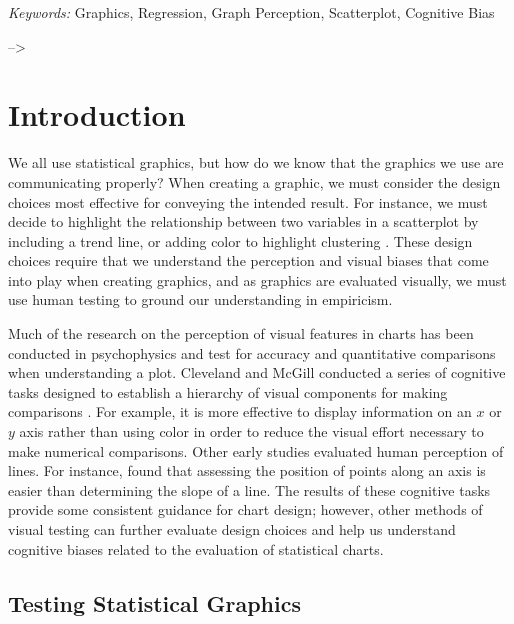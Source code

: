 \documentclass[12pt]{article}
\begin{document}
\noindent%
{\it Keywords:} Graphics, Regression, Graph
Perception, Scatterplot, Cognitive Bias
\vfill

\newpage
{} %

--\textgreater{}

\hypertarget{introduction}{%
\section{Introduction}\label{introduction}}

We all use statistical graphics, but how do we know that the graphics we
use are communicating properly? When creating a graphic, we must
consider the design choices most effective for conveying the intended
result. For instance, we must decide to highlight the relationship
between two variables in a scatterplot by including a trend line, or
adding color to highlight clustering \citep{vanderplas2017clusters}.
These design choices require that we understand the perception and
visual biases that come into play when creating graphics, and as
graphics are evaluated visually, we must use human testing to ground our
understanding in empiricism.

Much of the research on the perception of visual features in charts has
been conducted in psychophysics and test for accuracy and quantitative
comparisons when understanding a plot. Cleveland and McGill conducted a
series of cognitive tasks designed to establish a hierarchy of visual
components for making comparisons \citep{cleveland1984graphical}. For
example, it is more effective to display information on an \(x\) or
\(y\) axis rather than using color in order to reduce the visual effort
necessary to make numerical comparisons. Other early studies evaluated
human perception of lines. For instance, \citet{cleveland1985graphical}
found that assessing the position of points along an axis is easier than
determining the slope of a line. The results of these cognitive tasks
provide some consistent guidance for chart design; however, other
methods of visual testing can further evaluate design choices and help
us understand cognitive biases related to the evaluation of statistical
charts.

\hypertarget{testing-statistical-graphics}{%
\subsection{Testing Statistical
Graphics}\label{testing-statistical-graphics}}
\end{document}

